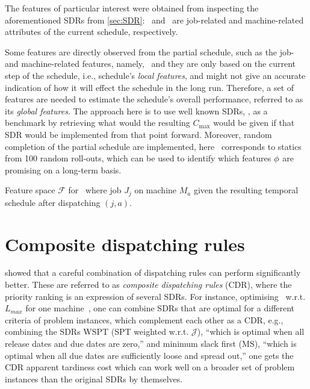 The features of particular interest were obtained from inspecting the aforementioned SDRs from \cref{sec:SDR}:  
\phiJobRelated\ and \phiMacRelated\ are job-related and machine-related attributes of the current schedule, respectively. 

Some features are directly observed from the partial schedule, such as the job- 
and machine-related features, namely, \phiLocalRelated\ and they are only based 
on the current step of the schedule, 
i.e., schedule's \emph{local features}, and might not give an accurate 
indication of how it will effect the schedule in the long run. Therefore, a set 
of features are needed to estimate the schedule's overall performance, referred 
to as its \emph{global features}. The approach here is to use well known SDRs, 
\phiSDRRelated, as a benchmark by retrieving what would the resulting 
$C_{\max}$ would be given if that SDR would be implemented from that point 
forward. Moreover, random completion of the partial schedule are implemented, 
here \phiRNDRelated\ corresponds to statics from 100 random roll-outs, which 
can be used to identify which features ${\mathbf{\phi}}$ are promising on a long-term 
basis.  


\begin{table} \centering 
	\caption[Feature space $\mathcal{F}$ for \JSP]{Feature space $\mathcal{F}$ for \JSP\ where job $J_j$ on machine $M_a$ given the resulting temporal schedule after dispatching $(j,a)$.}
	\label{tbl:features}
	
\end{table}



\section{Composite dispatching rules}\label{sec:CDR}
\citet{Jayamohan04} showed that a careful combination of dispatching rules can perform significantly better. These are referred to as \emph{composite dispatching rules} (CDR), where the priority ranking is an expression of several SDRs. For instance, optimising \JSP\ w.r.t. $L_{max}$ for one machine\ \cite[see. chapter 14.2]{Pinedo08}, one can combine SDRs that are optimal for a different criteria of problem instances, which complement each other as a CDR, e.g., combining the SDRs 
WSPT (SPT weighted w.r.t. $\mathcal{J}$), ``which is optimal when all release dates and due dates are zero,'' 
and minimum slack first (MS), ``which is optimal when all due dates are sufficiently loose and spread out,'' 
one gets the CDR apparent tardiness cost which can work well on a broader set 
of problem instances than the original SDRs by themselves.


